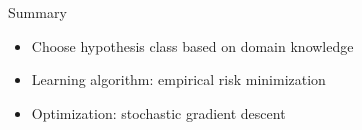\documentclass[usenames,dvipsnames,notes,11pt,aspectratio=169]{beamer}
\begin{document}
\begin{frame}
    {Summary}
    \begin{itemize}
        \itemsep2em
        \item Choose hypothesis class based on domain knowledge
        \item Learning algorithm: empirical risk minimization
        \item Optimization: stochastic gradient descent
    \end{itemize}
\end{frame}
\end{document}
